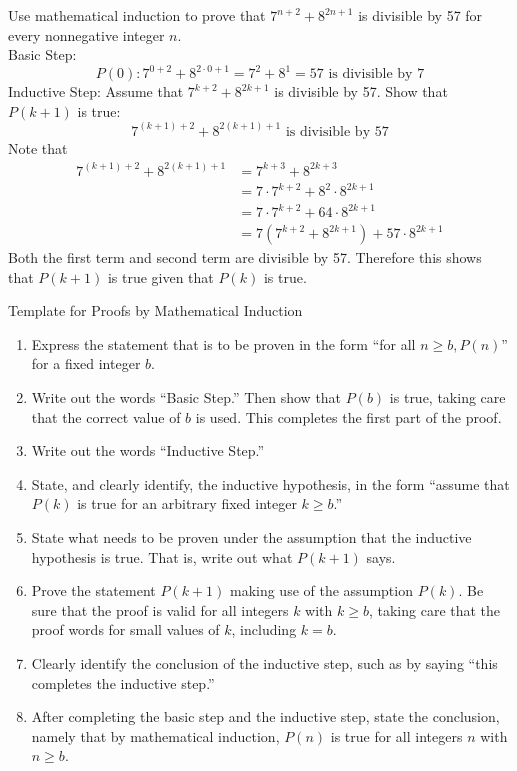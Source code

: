 \documentclass[12pt]{article}
\begin{document}
\begin{example} Use mathematical induction to prove that $7^{n + 2} + 8^{2n + 1}$ is divisible by 57 for every nonnegative integer $n$. \\ Basic Step: $$P(0): 7^{0 + 2} + 8^{2 \cdot 0 + 1} = 7^2 + 8^1 = 57 \text{ is divisible by 7}$$ Inductive Step: Assume that $7^{k + 2} + 8^{2k + 1}$ is divisible by 57. Show that $P(k + 1)$ is true: $$ 7^{(k + 1) + 2} + 8^{2(k + 1) + 1} \text{ is divisible by 57} $$ Note that $$\begin{aligned} 
7^{(k + 1) + 2} + 8^{2(k + 1) + 1} &= 7^{k + 3} + 8^{2k + 3} \\ &= 7 \cdot 7^{k + 2} + 8^2 \cdot 8^{2k + 1} \\ &= 7 \cdot 7^{k + 2} + 64 \cdot 8^{2k + 1} \\ &= 7(7^{k + 2} + 8^{2k + 1}) + 57 \cdot 8^{2k + 1} \end{aligned} $$ 
Both the first term and second term are divisible by 57. Therefore this shows that $P(k + 1)$ is true given that $P(k)$ is true. \end{example} 
Template for Proofs by Mathematical Induction  \begin{enumerate} 
\item Express the statement that is to be proven in the form ``for all $n \geq b, P(n)$'' for a fixed integer $b$. 
\item Write out the words ``Basic Step.'' Then show that $P(b)$ is true, taking care that the correct value of $b$ is used. This completes the first part of the proof. 
\item Write out the words ``Inductive Step.'' 
\item State, and clearly identify, the inductive hypothesis, in the form ``assume that $P(k)$ is true for an arbitrary fixed integer $k \geq b$.'' 
\item State what needs to be proven under the assumption that the inductive hypothesis is true. That is, write out what $P(k + 1)$ says. 
\item Prove the statement $P(k + 1)$ making use of the assumption $P(k)$. Be sure that the proof is valid for all integers $k$ with $k \geq b$, taking care that the proof words for small values of $k$, including $k = b$. 
\item Clearly identify the conclusion of the inductive step, such as by saying ``this completes the inductive step.''
\item After completing the basic step and the inductive step, state the conclusion, namely that by mathematical induction, $P(n)$ is true for all integers $n$ with $n \geq b$. \end{enumerate} 
\end{document}

